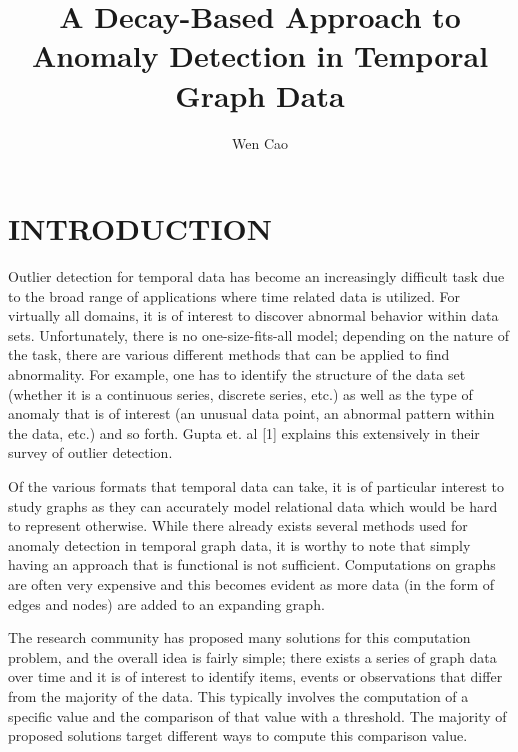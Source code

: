 \documentclass[letterpaper, 10 pt, conference]{ieeeconf}  %
\title{\LARGE \bf
A Decay-Based Approach to Anomaly Detection in Temporal Graph Data
}
\author{Wen Cao}
\begin{document}
\maketitle
\thispagestyle{empty}
\pagestyle{empty}

\section{INTRODUCTION}
\par Outlier detection for temporal data has become an increasingly difficult task due to the broad range of applications where time related data is utilized. For virtually all domains, it is of interest to discover abnormal behavior within data sets. Unfortunately, there is no one-size-fits-all model; depending on the nature of the task, there are various different methods that can be applied to find abnormality. For example, one has to identify the structure of the data set (whether it is a continuous series, discrete series, etc.) as well as the type of anomaly that is of interest (an unusual data point, an abnormal pattern within the data, etc.) and so forth. Gupta et. al [1] explains this extensively in their survey of outlier detection.

\par Of the various formats that temporal data can take, it is of particular interest to study graphs as they can accurately model relational data which would be hard to represent otherwise. While there already exists several methods used for anomaly detection in temporal graph data, it is worthy to note that simply having an approach that is functional is not sufficient. Computations on graphs are often very expensive and this becomes evident as more data (in the form of edges and nodes) are added to an expanding graph. 

\par The research community has proposed many solutions for this computation problem, and the overall idea is fairly simple; there exists a series of graph data over time and it is of interest to identify items, events or observations that differ from the majority of the data. This typically involves the computation of a specific value and the comparison of that value with a threshold. The majority of proposed solutions target different ways to compute this comparison value.
\end{document}
